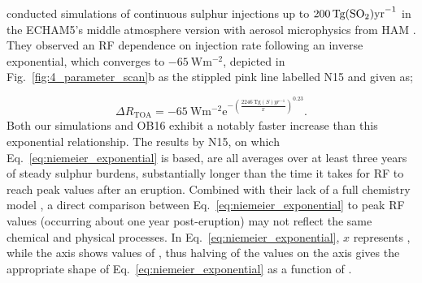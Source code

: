 \documentclass[draft]{agujournal2019}
\begin{document}
   conducted simulations of continuous sulphur injections up to
  \(\SI{200}{\tera\gram(\ce{SO2})\mathrm{yr}^{-1}}\) in the ECHAM5's middle atmosphere
  version \cite{giorgetta2006} with aerosol microphysics from HAM \cite{stier2005}. They
  observed an RF dependence on  injection rate following an inverse exponential,
  which converges to \(\SI{-65}{\watt\meter^{-2}}\), depicted in
  Fig.~\ref{fig:4_parameter_scan}b as the stippled pink line labelled N15 and given as;

  \begin{equation}
    \Delta R_{\mathrm{TOA}} = -\SI{65}{\watt\metre^{-2}}
    \mathrm{e}^{-{\left(\frac{\SI{2246}{\tera\gram(S)yr^{-1}}}{x}\right)}^{0.23}}.
    \label{eq:niemeier_exponential}
  \end{equation}
  Both our simulations and OB16 exhibit a notably faster increase than this exponential
  relationship. The results by N15, on which Eq.~\ref{eq:niemeier_exponential} is based,
  are all averages over at least three years of steady sulphur burdens, substantially
  longer than the time it takes for RF to reach peak values after an eruption. Combined
  with their lack of a full chemistry model \cite{niemeier2015}, a direct comparison
  between Eq.~\ref{eq:niemeier_exponential} to peak RF values (occurring about one year
  post-eruption) may not reflect the same chemical and physical processes. In
  Eq.~\ref{eq:niemeier_exponential}, \(x\) represents , while the axis shows
  values of , thus halving of the  values on the axis gives the
  appropriate shape of Eq.~\ref{eq:niemeier_exponential} as a function of .
\end{document}
